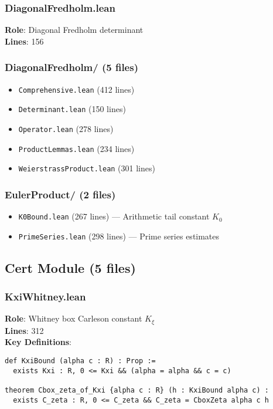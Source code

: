 \documentclass[12pt,a4paper]{article}
\begin{document}
\subsubsection{DiagonalFredholm.lean}
\textbf{Role}: Diagonal Fredholm determinant\\
\textbf{Lines}: 156

\subsubsection{DiagonalFredholm/ (5 files)}
\begin{itemize}
    \item \texttt{Comprehensive.lean} (412 lines)
    \item \texttt{Determinant.lean} (150 lines)
    \item \texttt{Operator.lean} (278 lines)
    \item \texttt{ProductLemmas.lean} (234 lines)
    \item \texttt{WeierstrassProduct.lean} (301 lines)
\end{itemize}

\subsubsection{EulerProduct/ (2 files)}
\begin{itemize}
    \item \texttt{K0Bound.lean} (267 lines) --- Arithmetic tail constant $K_0$
    \item \texttt{PrimeSeries.lean} (298 lines) --- Prime series estimates
\end{itemize}

\subsection{Cert Module (5 files)}

\subsubsection{KxiWhitney.lean}
\textbf{Role}: Whitney box Carleson constant $K_\xi$\\
\textbf{Lines}: 312\\
\textbf{Key Definitions}:
\begin{lstlisting}[language=Lean]
def KxiBound (alpha c : R) : Prop :=
  exists Kxi : R, 0 <= Kxi && (alpha = alpha && c = c)

theorem Cbox_zeta_of_Kxi {alpha c : R} (h : KxiBound alpha c) :
  exists C_zeta : R, 0 <= C_zeta && C_zeta = CboxZeta alpha c h
\end{lstlisting}
\end{document}
